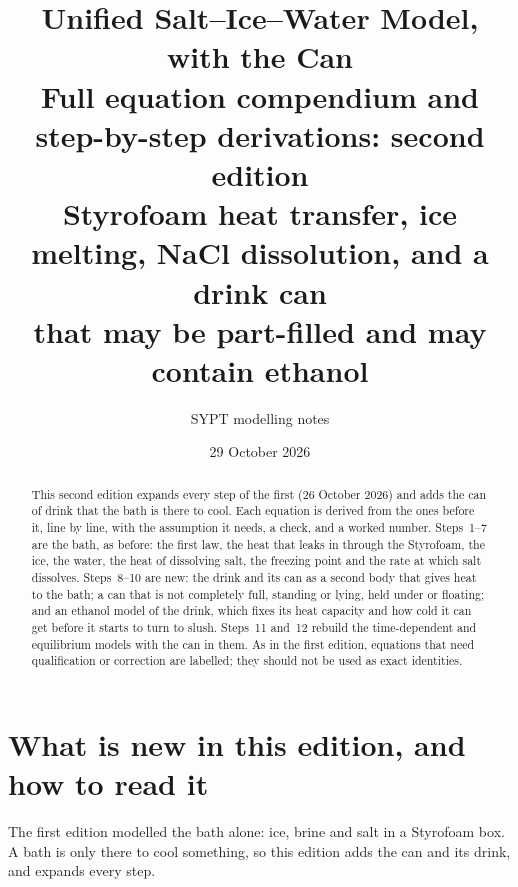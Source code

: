 \documentclass[11pt,a4paper]{article}
\title{\textbf{Unified Salt--Ice--Water Model, with the Can}\\[4pt]
  \large Full equation compendium and step-by-step derivations: second edition\\[3pt]
  \normalsize Styrofoam heat transfer, ice melting, NaCl dissolution, and a drink can\\
  that may be part-filled and may contain ethanol}
\author{SYPT modelling notes}
\date{29 October 2026}
\begin{document}
\maketitle

\begin{abstract}
This second edition expands every step of the first (26 October 2026) and adds the can of drink that the
bath is there to cool. Each equation is derived from the ones before it, line by line, with the
assumption it needs, a check, and a worked number. Steps~1--7 are the bath, as before: the first law, the
heat that leaks in through the Styrofoam, the ice, the water, the heat of dissolving salt, the freezing
point and the rate at which salt dissolves. Steps~8--10 are new: the drink and its can as a second body
that gives heat to the bath; a can that is not completely full, standing or lying, held under or floating;
and an ethanol model of the drink, which fixes its heat capacity and how cold it can get before it starts
to turn to slush. Steps~11 and~12 rebuild the time-dependent and equilibrium models with the can in them.
As in the first edition, equations that need qualification or correction are labelled; they should not be
used as exact identities.
\end{abstract}

\tableofcontents
\clearpage

\section*{What is new in this edition, and how to read it}

The first edition modelled the bath alone: ice, brine and salt in a Styrofoam box. A bath is only there to
cool something, so this edition adds the can and its drink, and expands every step.
\end{document}
